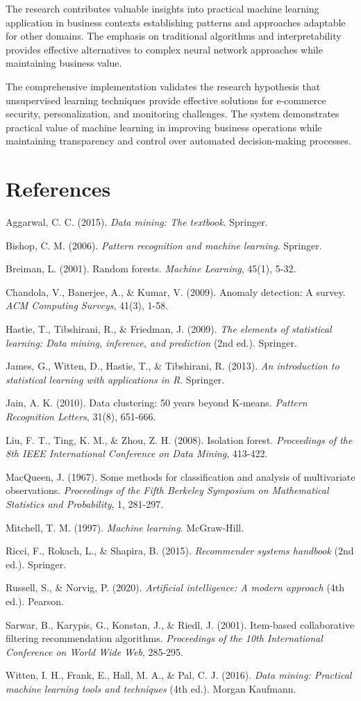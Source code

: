 \documentclass[12pt]{article}
\begin{document}
The research contributes valuable insights into practical machine learning application in business contexts establishing patterns and approaches adaptable for other domains. The emphasis on traditional algorithms and interpretability provides effective alternatives to complex neural network approaches while maintaining business value.

The comprehensive implementation validates the research hypothesis that unsupervised learning techniques provide effective solutions for e-commerce security, personalization, and monitoring challenges. The system demonstrates practical value of machine learning in improving business operations while maintaining transparency and control over automated decision-making processes.

\section{References}

Aggarwal, C. C. (2015). \textit{Data mining: The textbook}. Springer.

Bishop, C. M. (2006). \textit{Pattern recognition and machine learning}. Springer.

Breiman, L. (2001). Random forests. \textit{Machine Learning}, 45(1), 5-32.

Chandola, V., Banerjee, A., \& Kumar, V. (2009). Anomaly detection: A survey. \textit{ACM Computing Surveys}, 41(3), 1-58.

Hastie, T., Tibshirani, R., \& Friedman, J. (2009). \textit{The elements of statistical learning: Data mining, inference, and prediction} (2nd ed.). Springer.

James, G., Witten, D., Hastie, T., \& Tibshirani, R. (2013). \textit{An introduction to statistical learning with applications in R}. Springer.

Jain, A. K. (2010). Data clustering: 50 years beyond K-means. \textit{Pattern Recognition Letters}, 31(8), 651-666.

Liu, F. T., Ting, K. M., \& Zhou, Z. H. (2008). Isolation forest. \textit{Proceedings of the 8th IEEE International Conference on Data Mining}, 413-422.

MacQueen, J. (1967). Some methods for classification and analysis of multivariate observations. \textit{Proceedings of the Fifth Berkeley Symposium on Mathematical Statistics and Probability}, 1, 281-297.

Mitchell, T. M. (1997). \textit{Machine learning}. McGraw-Hill.

Ricci, F., Rokach, L., \& Shapira, B. (2015). \textit{Recommender systems handbook} (2nd ed.). Springer.

Russell, S., \& Norvig, P. (2020). \textit{Artificial intelligence: A modern approach} (4th ed.). Pearson.

Sarwar, B., Karypis, G., Konstan, J., \& Riedl, J. (2001). Item-based collaborative filtering recommendation algorithms. \textit{Proceedings of the 10th International Conference on World Wide Web}, 285-295.

Witten, I. H., Frank, E., Hall, M. A., \& Pal, C. J. (2016). \textit{Data mining: Practical machine learning tools and techniques} (4th ed.). Morgan Kaufmann.
\end{document}

